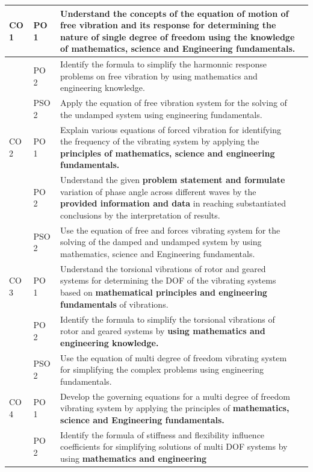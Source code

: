\documentclass[11pt]{exam}
\begin{document}
\begin{flushleft}
\begin{longtable}{|>{\centering\arraybackslash}p{1.8cm}  | >{\centering\arraybackslash}p{1.2cm}  |   >{\raggedright\arraybackslash}p{10cm} |>{\centering\arraybackslash}p{2cm}|}
		\hline
		\endhead
		 CO 1&	PO 1&Understand the concepts of the equation of motion of free vibration and its response for determining the nature of single degree of freedom  using the knowledge of \textbf {mathematics, science and Engineering fundamentals.} &	3\\\cline{2-4}
		 &PO 2& Identify the formula to simplify the harmonnic
		 response problems on free vibration by using
		 mathematics and engineering knowledge.&
		 2\\\cline{2-4}
		 &PSO 2& Apply the equation of free vibration system for the
		 solving of the undamped system using engineering
		 fundamentals.&
		 1\\\hline
		CO 2&	PO 1&	Explain various equations of forced vibration for
		identifying the frequency of the vibrating system by
		applying the \textbf{principles of mathematics, science and
		engineering fundamentals.}&	3\\\cline{2-4}
		&PO 2&	Understand the given \textbf{problem statement and
		formulate} variation of phase angle across different
		waves by the \textbf{provided information and data} in
		reaching substantiated conclusions by the
		interpretation of results.
 &	2\\\cline{2-4}
&PSO 2& Use the equation of free and forces vibrating system for
the solving of the damped and undamped system by
using mathematics, science and Engineering
fundamentals.&
1
\\\hline
		CO 3&	PO 1&	Understand the torsional vibrations of rotor and
		geared systems for determining the DOF of the
		vibrating systems based on \textbf{mathematical principles
		and engineering fundamentals }of vibrations. &	3\\\cline{2-4}
      &	PO 2&	Identify the formula to simplify the torsional vibrations
      of rotor and geared systems by \textbf{using mathematics
      and engineering knowledge. } &	2\\\cline{2-4}  
 &	PSO 2&	Use the equation of multi degree of freedom vibrating
 system for simplifying the complex problems using
 engineering fundamentals. &	1\\\hline
		CO 4&	PO 1&	Develop the governing equations for a multi degree of
		freedom vibrating system by applying the principles of
		\textbf{mathematics, science and Engineering
		fundamentals.} &	3\\\cline{2-4}
      &	PO 2&Identify the formula of stiffness and flexibility influence
      coefficients for simplifying solutions of multi DOF
      systems by using \textbf{mathematics and engineering
}
\end{longtable}
\end{flushleft}
\end{document}
